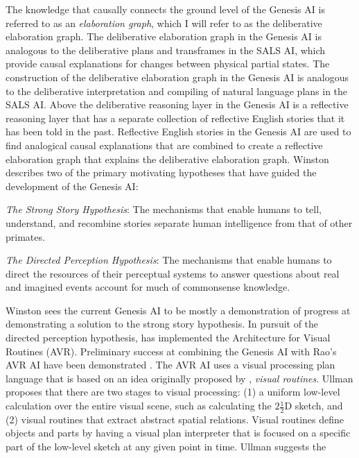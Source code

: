 The knowledge that causally connects the ground level of the Genesis
AI is referred to as an {\emph{elaboration graph}}, which I will refer
to as the deliberative elaboration graph.  The deliberative
elaboration graph in the Genesis AI is analogous to the deliberative
plans and transframes in the SALS AI, which provide causal
explanations for changes between physical partial states.  The
construction of the deliberative elaboration graph in the Genesis AI
is analogous to the deliberative interpretation and compiling of
natural language plans in the SALS AI.  Above the deliberative
reasoning layer in the Genesis AI is a reflective reasoning layer that
has a separate collection of reflective English stories that it has
been told in the past.  Reflective English stories in the Genesis AI
are used to find analogical causal explanations that are combined to
create a reflective elaboration graph that explains the deliberative
elaboration graph.  Winston describes two of the primary motivating
hypotheses that have guided the development of the Genesis AI:
\begin{packed_enumerate}
\item{{\emph{The Strong Story Hypothesis}}: The mechanisms that enable
  humans to tell, understand, and recombine stories separate human
  intelligence from that of other primates.}
\item{{\emph{The Directed Perception Hypothesis}}: The mechanisms that
  enable humans to direct the resources of their perceptual systems to
  answer questions about real and imagined events account for much of
  commonsense knowledge.}
\end{packed_enumerate}
Winston sees the current Genesis AI to be mostly a demonstration of
progress at demonstrating a solution to the strong story hypothesis.
In pursuit of the directed perception hypothesis, \cite{rao:1998} has
implemented the Architecture for Visual Routines (AVR).  Preliminary
success at combining the Genesis AI with Rao's AVR AI have been
demonstrated \cite[]{winston:2011}.  The AVR AI uses a visual
processing plan language that is based on an idea originally proposed
by \cite{ullman:1984}, {\emph{visual routines}}.  Ullman proposes that
there are two stages to visual processing: (1) a uniform low-level
calculation over the entire visual scene, such as calculating the
$2\frac{1}{2}$D sketch, and (2) visual routines that extract abstract
spatial relations.  Visual routines define objects and parts by having
a visual plan interpreter that is focused on a specific part of the
low-level sketch at any given point in time.  Ullman suggests the
